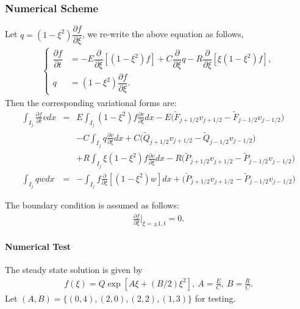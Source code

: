 \documentclass[final,leqno]{siamltex704}
\begin{document}
	\subsubsection{Numerical Scheme}
	Let $q=(1-\xi^2)\dfrac{\partial f}{\partial\xi}$, we re-write the above equation as follows,
	\begin{eqnarray*}
		\begin{cases}
	\dfrac{\partial f}{\partial t} &= -E\dfrac{\partial}{\partial\xi}[(1-\xi^2)f]+C\dfrac{\partial}{\partial\xi}q-R\dfrac{\partial}{\partial\xi}[\xi(1-\xi^2)f],\\
	q &= (1-\xi^2)\dfrac{\partial f}{\partial\xi}. 
		\end{cases}
	\end{eqnarray*}
	Then the corresponding variational forms are:
	\begin{eqnarray*}
	\int_{I_j}\frac{\partial f}{\partial t}v dx&=& E\int_{I_j}(1-\xi^2)f \frac{\partial v}{\partial \xi} dx - E\big(\tilde{F}_{j+1/2}v_{j+1/2}-\tilde{F}_{j-1/2}v_{j-1/2}\big)\\
	&& - C\int_{I_j} q \frac{\partial v}{\partial\xi} dx + C\big(\tilde{Q}_{j+1/2}v_{j+1/2}-\tilde{Q}_{j-1/2}v_{j-1/2}\big)\\
	&& + R\int_{I_j}\xi(1-\xi^2)f \frac{\partial v}{\partial \xi} dx - R\big(\tilde{P}_{j+1/2}v_{j+1/2}-\tilde{P}_{j-1/2}v_{j-1/2}\big)\\
	\int_{I_j} qw dx &=& -\int_{I_j}f\frac{\partial }{\partial\xi}[(1-\xi^2)w] dx + \big(\tilde{P}_{j+1/2}v_{j+1/2}-\tilde{P}_{j-1/2}v_{j-1/2}\big)
	\end{eqnarray*}

The boundary condition is assumed as follows:
\begin{eqnarray}
\frac{\partial f}{\partial\xi}|_{\xi = \pm 1,t} = 0.
\end{eqnarray}

\paragraph{Numerical Test}
The steady state solution is given by
\begin{eqnarray*}
f(\xi) = Q\exp\left[A\xi+(B/2)\xi^2\right],\ A = \frac{E}{C},\ B=\frac{R}{C}.
\end{eqnarray*}
Let $(A,B) = \{(0,4),(2,0),(2,2),(1,3)\}$ for testing.
\end{document}
